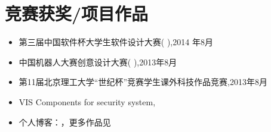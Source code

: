 \section{竞赛获奖/项目作品}
\begin{itemize}[parsep=0.2ex]
  \item 第三届中国软件杯大学生软件设计大赛(  ),2014 年8月
  \item 中国机器人大赛创意设计大赛(  ),2013年8月
  \item 第11届北京理工大学“世纪杯”竞赛学生课外科技作品竞赛,2013年8月
  \item VIS Components for security system, 
  \item 个人博客：，更多作品见 
\end{itemize}